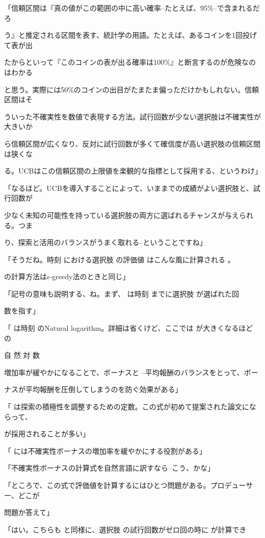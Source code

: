 「信頼区間は『真の値がこの範囲の中に⾼い確率--たとえば、95\%--で含まれるだろ\par
う』と推定される区間を表す、統計学の⽤語。たとえば、あるコインを1回投げて表が出\par
たからといって『このコインの表が出る確率は100\%』と断⾔するのが危険なのはわかる\par
と思う。実際には50\%のコインの出⽬がたまたま偏っただけかもしれない。信頼区間はそ\par
ういった不確実性を数値で表現する⽅法。試⾏回数が少ない選択肢は不確実性が⼤きいか\par
ら信頼区間が広くなり、反対に試⾏回数が多くて確信度が⾼い選択肢の信頼区間は狭くな\par
る。UCBはこの信頼区間の上限値を楽観的な指標として採⽤する、というわけ」\par
「なるほど。UCBを導⼊することによって、いままでの成績がよい選択肢と、試⾏回数が\par
少なく未知の可能性を持っている選択肢の両⽅に選ばれるチャンスが与えられる。つま\par
り、探索と活⽤のバランスがうまく取れる--ということですね」\par
「そうだね。時刻 における選択肢 の評価値 はこんな⾵に計算される 。\par
の計算⽅法は$\epsilon$-greedy法のときと同じ」\par
「記号の意味も説明する、ね。まず、 は時刻 までに選択肢 が選ばれた回\par
数を指す」\par
「 は時刻 のNatural logarithm。詳細は省くけど、ここでは が⼤きくなるほど の\par
⾃ 然 対 数\par
増加率が緩やかになることで、ボーナスと --平均報酬のバランスをとって、ボー\par
ナスが平均報酬を圧倒してしまうのを防ぐ効果がある」\par
「 は探索の積極性を調整するための定数。この式が初めて提案された論⽂にならって、\par
が採⽤されることが多い」\par
「 には不確実性ボーナスの増加率を緩やかにする役割がある」\par
「不確実性ボーナスの計算式を⾃然⾔語に訳すなら--こう、かな」\par
「ところで、この式で評価値を計算するにはひとつ問題がある。プロデューサー、どこが\par
問題か答えて」\par
「はい。こちらも と同様に、選択肢 の試⾏回数がゼロ回の時に が計算でき\par
